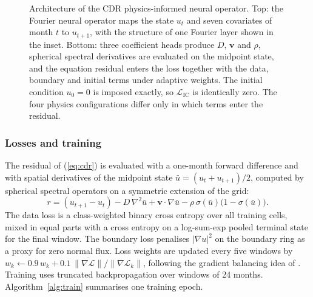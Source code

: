 \documentclass[journal]{IEEEtran}
\begin{document}
\begin{figure}[!t]
\caption{Architecture of the CDR physics-informed neural operator. Top: the Fourier neural operator maps the state $u_t$ and seven covariates of month $t$ to $u_{t+1}$, with the structure of one Fourier layer shown in the inset. Bottom: three coefficient heads produce $D$, $\mathbf{v}$ and $\rho$, spherical spectral derivatives are evaluated on the midpoint state, and the equation residual enters the loss together with the data, boundary and initial terms under adaptive weights. The initial condition $u_0=0$ is imposed exactly, so $\mathcal{L}_{\mathrm{IC}}$ is identically zero. The four physics configurations differ only in which terms enter the residual.}
\label{fig:arch}
\end{figure}

\subsubsection{Losses and training}
The residual of (\ref{eq:cdr}) is evaluated with a one-month forward difference and with spatial derivatives of the midpoint state $\bar u=(u_t+u_{t+1})/2$, computed by spherical spectral operators on a symmetric extension of the grid:
\begin{equation}
r=(u_{t+1}-u_t)-D\,\nabla^{2}\bar u+\mathbf{v}\cdot\nabla\bar u-\rho\,\sigma(\bar u)\bigl(1-\sigma(\bar u)\bigr).
\label{eq:residual}
\end{equation}
The data loss is a class-weighted binary cross entropy over all training cells, mixed in equal parts with a cross entropy on a log-sum-exp pooled terminal state for the final window. The boundary loss penalises $|\nabla u|^{2}$ on the boundary ring as a proxy for zero normal flux. Loss weights are updated every five windows by $w_k\leftarrow0.9\,w_k+0.1\,\overline{\|\nabla\mathcal{L}\|}/\|\nabla\mathcal{L}_k\|$, following the gradient balancing idea of \cite{wang2021gradient}. Training uses truncated backpropagation over windows of 24 months. Algorithm~\ref{alg:train} summarises one training epoch.
\end{document}
